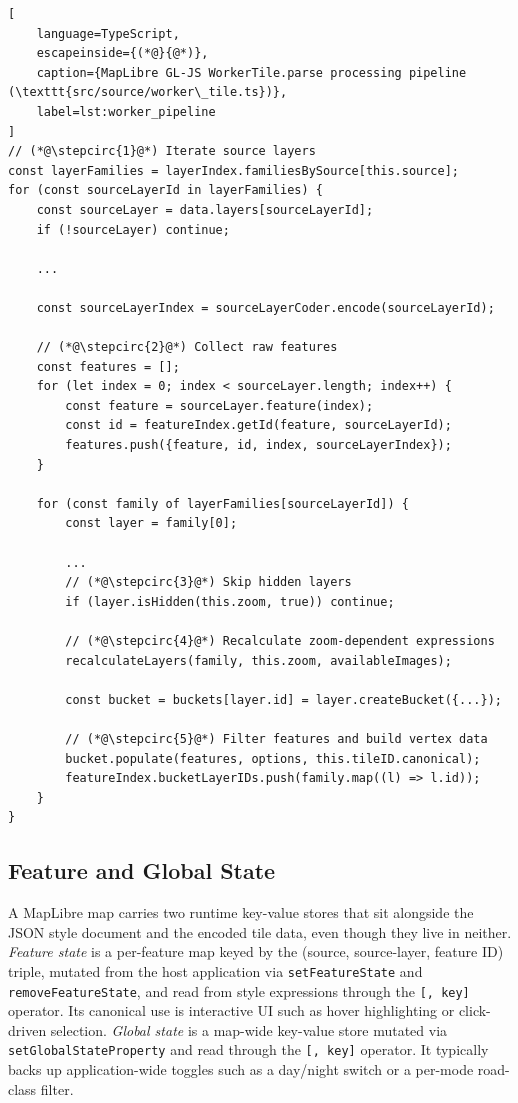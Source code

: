 \begin{lstlisting}[
    language=TypeScript,
    escapeinside={(*@}{@*)},
    caption={MapLibre GL-JS WorkerTile.parse processing pipeline (\texttt{src/source/worker\_tile.ts})},
    label=lst:worker_pipeline
]
// (*@\stepcirc{1}@*) Iterate source layers
const layerFamilies = layerIndex.familiesBySource[this.source];
for (const sourceLayerId in layerFamilies) {
    const sourceLayer = data.layers[sourceLayerId];
	if (!sourceLayer) continue;

    ...

    const sourceLayerIndex = sourceLayerCoder.encode(sourceLayerId);

    // (*@\stepcirc{2}@*) Collect raw features
    const features = [];
    for (let index = 0; index < sourceLayer.length; index++) {
        const feature = sourceLayer.feature(index);
        const id = featureIndex.getId(feature, sourceLayerId);
        features.push({feature, id, index, sourceLayerIndex});
    }

    for (const family of layerFamilies[sourceLayerId]) {
        const layer = family[0];

        ...
        // (*@\stepcirc{3}@*) Skip hidden layers
        if (layer.isHidden(this.zoom, true)) continue;

        // (*@\stepcirc{4}@*) Recalculate zoom-dependent expressions
        recalculateLayers(family, this.zoom, availableImages);

        const bucket = buckets[layer.id] = layer.createBucket({...});

        // (*@\stepcirc{5}@*) Filter features and build vertex data
        bucket.populate(features, options, this.tileID.canonical);
        featureIndex.bucketLayerIDs.push(family.map((l) => l.id));
    }
}
\end{lstlisting}

\subsection{Feature and Global State}\label{sub:feature_state}

A MapLibre map carries two runtime key-value stores that sit alongside the JSON style document and the encoded tile data, even though they live in neither.
\emph{Feature state} is a per-feature map keyed by the (source, source-layer, feature ID) triple, mutated from the host application via \texttt{setFeatureState} and \texttt{removeFeatureState}, and read from style expressions through the \texttt{[,~key]} operator.
Its canonical use is interactive UI such as hover highlighting or click-driven selection.
\emph{Global state} is a map-wide key-value store mutated via \texttt{setGlobalStateProperty} and read through the \texttt{[,~key]} operator.
It typically backs up application-wide toggles such as a day/night switch or a per-mode road-class filter.

